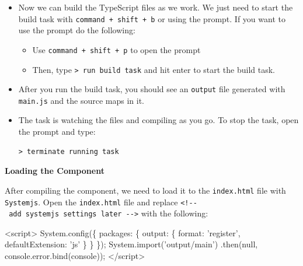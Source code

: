 \documentclass[12pt,]{article}
\newenvironment{Shaded}{}{}
\newcommand{\KeywordTok}[1]{\textcolor[rgb]{0.00,0.00,1.00}{{#1}}}
\newcommand{\DataTypeTok}[1]{{#1}}
\newcommand{\StringTok}[1]{\textcolor[rgb]{0.00,0.50,0.50}{{#1}}}
\newcommand{\SpecialStringTok}[1]{\textcolor[rgb]{0.00,0.50,0.50}{{#1}}}
\newcommand{\VariableTok}[1]{{#1}}
\newcommand{\OperatorTok}[1]{{#1}}
\newcommand{\AttributeTok}[1]{{#1}}
\newcommand{\NormalTok}[1]{{#1}}
\begin{document}
\begin{itemize}
\item
  Now we can build the TypeScript files as we work. We just need to
  start the build task with \texttt{command\ +\ shift\ +\ b} or using
  the prompt. If you want to use the prompt do the following:

  \begin{itemize}
  \item
    Use \texttt{command\ +\ shift\ +\ p} to open the prompt
  \item
    Then, type \texttt{\textgreater{}\ run\ build\ task} and hit enter
    to start the build task.
  \end{itemize}
\item
  After you run the build task, you should see an \texttt{output} file
  generated with \texttt{main.js} and the source maps in it.
\item
  The task is watching the files and compiling as you go. To stop the
  task, open the prompt and type:

\begin{verbatim}
> terminate running task
\end{verbatim}
\end{itemize}

\textbf{Loading the Component}

After compiling the component, we need to load it to the
\texttt{index.html} file with \texttt{Systemjs}. Open the
\texttt{index.html} file and replace
\texttt{\textless{}!-\/-\ add\ systemjs\ settings\ later\ -\/-\textgreater{}}
with the following:

\begin{Shaded}
\begin{Highlighting}[numbers=left,,]
\KeywordTok{<script>}
  \VariableTok{System}\NormalTok{.}\AttributeTok{config}\NormalTok{(}\OperatorTok{\{}
    \DataTypeTok{packages}\OperatorTok{:} \OperatorTok{\{}
      \DataTypeTok{output}\OperatorTok{:} \OperatorTok{\{}
        \DataTypeTok{format}\OperatorTok{:} \StringTok{'register'}\OperatorTok{,}
        \DataTypeTok{defaultExtension}\OperatorTok{:} \StringTok{'js'}
      \OperatorTok{\}}
    \OperatorTok{\}}
  \OperatorTok{\}}\NormalTok{)}\OperatorTok{;}
  \VariableTok{System}\NormalTok{.}\AttributeTok{import}\NormalTok{(}\StringTok{'output/main'}\NormalTok{)}
  \NormalTok{.}\AttributeTok{then}\NormalTok{(}\KeywordTok{null}\OperatorTok{,} \VariableTok{console}\NormalTok{.}\VariableTok{error}\NormalTok{.}\AttributeTok{bind}\NormalTok{(console))}\OperatorTok{;}
\OperatorTok{<}\SpecialStringTok{/script>}
\end{Highlighting}
\end{Shaded}
\end{document}
